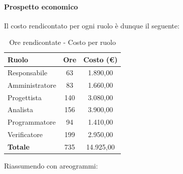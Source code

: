 \documentclass[../PianoProgetto.tex]{subfiles}
\begin{document}
\vfill
	
	\paragraph{Prospetto economico}
					Il costo rendicontato per ogni ruolo è dunque il seguente:
	\begin{table}[h]
		\centering
		\begin{tabular}{l * {2}{c}}
			\toprule
			\textbf{Ruolo} & \textbf{Ore} & \textbf{Costo (\euro{})} \\
			\midrule
			Responsabile &	63 & 1.890,00 \\
			Amministratore & 83 & 1.660,00 \\
			Progettista & 140 & 3.080,00 \\
			Analista & 156 & 3.900,00 \\
			Programmatore & 94 & 1.410,00 \\
			Verificatore & 199 & 2.950,00 \\
			\midrule		
			\textbf{Totale} & 735 & 14.925,00 \\
			\bottomrule
		\end{tabular}
		\caption{Ore rendicontate - Costo per ruolo}
		\label{tab:rendicontate_costo}
	\end{table}
\vfill
\newpage
\vfill	
	Riassumendo con areogrammi:
\end{document}
